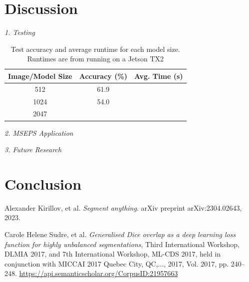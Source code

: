 \documentclass{article}
\begin{document}
\medskip

\section*{Discussion}
\textit{1. Testing} \\

\begin{table}[H]
    \centering
    \begin{tabular}{ | c | c | c | }
        \hline
        Image/Model Size & Accuracy (\%) & Avg. Time (s) \\ 
        \hline
        512 & 61.9 & \\
        1024 & 54.0 & \\
        2047 & & \\
        \hline
    \end{tabular}
    \captionsetup{width=.8\linewidth} 
    \caption{Test accuracy and average runtime for each model size. Runtimes are from running on a Jetson TX2}
\end{table}

\textit{2. MSEPS Application}

\textit{3. Future Research}

\medskip

\section*{Conclusion}


\medskip

\begin{thebibliography}{9}

        Alexander Kirillov, et al. 
        \textit{Segment anything}. 
        arXiv preprint arXiv:2304.02643, 2023.
    
        Carole Helene Sudre, et al.
        \textit{Generalised Dice overlap as a deep learning loss function for highly unbalanced segmentations},
        Third International Workshop, DLMIA 2017, and 7th International Workshop, ML-CDS 2017, held in conjunction with MICCAI 2017 Quebec City, QC,...,
        2017, Vol. 2017, pp. 240--248.
        \url{https://api.semanticscholar.org/CorpusID:21957663}
    

\end{thebibliography}
\end{document}
